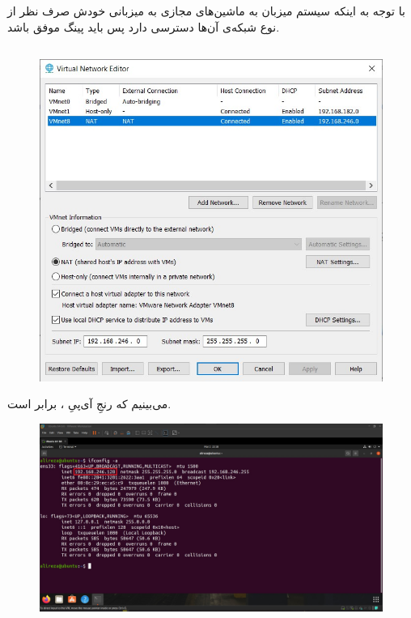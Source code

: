 \documentclass{article}
\begin{document}
با توجه به اینکه سیستم میزبان به ماشین‌های مجازی به میزبانی خودش صرف نظر از نوع شبکه‌ی آن‌ها دسترسی دارد پس باید پینگ موفق باشد.
\subsection{}
\begin{figure}[H]
    \centering
    \includegraphics[width=1.0\textwidth]{figures/4a.jpg}
    \caption
	{
	}
    \label{fig:fig1}
\end{figure}
می‌بینیم که رنجِ آی‌پیِ ، برابر  است.
\begin{figure}[H]
    \centering
    \includegraphics[width=1.0\textwidth]{figures/4b.jpg}
    \caption
	{
	}
    \label{fig:fig1}
\end{figure}
\end{document}
